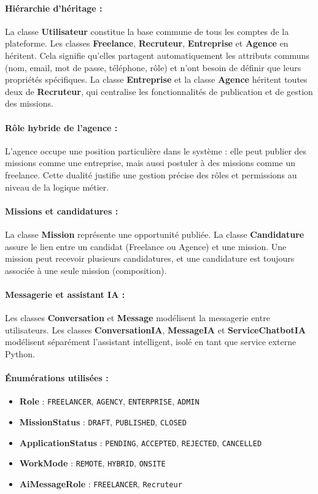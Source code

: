 \paragraph{Hiérarchie d'héritage :}
La classe \textbf{Utilisateur} constitue la base commune de tous les comptes de la plateforme. Les classes \textbf{Freelance}, \textbf{Recruteur}, \textbf{Entreprise} et \textbf{Agence} en héritent. Cela signifie qu'elles partagent automatiquement les attributs communs (nom, email, mot de passe, téléphone, rôle) et n'ont besoin de définir que leurs propriétés spécifiques. La classe \textbf{Entreprise} et la classe \textbf{Agence} héritent toutes deux de \textbf{Recruteur}, qui centralise les fonctionnalités de publication et de gestion des missions.

\paragraph{Rôle hybride de l'agence :}
L'agence occupe une position particulière dans le système : elle peut publier des missions comme une entreprise, mais aussi postuler à des missions comme un freelance. Cette dualité justifie une gestion précise des rôles et permissions au niveau de la logique métier.

\paragraph{Missions et candidatures :}
La classe \textbf{Mission} représente une opportunité publiée. La classe \textbf{Candidature} assure le lien entre un candidat (Freelance ou Agence) et une mission. Une mission peut recevoir plusieurs candidatures, et une candidature est toujours associée à une seule mission (composition).

\paragraph{Messagerie et assistant IA :}
Les classes \textbf{Conversation} et \textbf{Message} modélisent la messagerie entre utilisateurs. Les classes \textbf{ConversationIA}, \textbf{MessageIA} et \textbf{ServiceChatbotIA} modélisent séparément l'assistant intelligent, isolé en tant que service externe Python.

\paragraph{Énumérations utilisées :}
\begin{itemize}
    \item \textbf{Role} : \texttt{FREELANCER}, \texttt{AGENCY}, \texttt{ENTERPRISE}, \texttt{ADMIN}
    \item \textbf{MissionStatus} : \texttt{DRAFT}, \texttt{PUBLISHED}, \texttt{CLOSED}
    \item \textbf{ApplicationStatus} : \texttt{PENDING}, \texttt{ACCEPTED}, \texttt{REJECTED}, \texttt{CANCELLED}
    \item \textbf{WorkMode} : \texttt{REMOTE}, \texttt{HYBRID}, \texttt{ONSITE}
    \item \textbf{AiMessageRole} : \texttt{FREELANCER}, \texttt{Recruteur}
\end{itemize}


